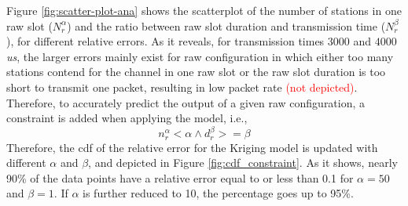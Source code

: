  
 
 
Figure \ref{fig:scatter-plot-ana} shows the scatterplot of the number of stations in one \gls{raw} slot ($N^{\alpha}_{r}$) and the ratio between \gls{raw} slot duration and transmission time ($N^{\beta}_r$), for different relative errors. As it reveals, for transmission times $3000$ and $4000$ \textit{us}, the larger errors mainly exist for \gls{raw} configuration in which either too many stations contend for the channel in one \gls{raw} slot or the \gls{raw} slot duration is too short to transmit one packet, resulting in low packet rate \textcolor{red}{(not depicted)}. Therefore, to accurately predict the output of a given \gls{raw} configuration, a constraint is added when applying the model, i.e., 
\begin{equation} \label{eq:constraint}
n^{\alpha}_r < \alpha \wedge d^{\beta}_r >= \beta
\end{equation}
Therefore, the \gls{cdf} of the relative error for the Kriging model is updated with different $\alpha$ and $\beta$, and depicted in Figure \ref{fig:cdf_constraint}. As it shows, nearly 90\% of the data points have a relative error equal to or less than 0.1 for $\alpha = 50$ and $\beta = 1$. If $\alpha$ is further reduced to 10, the percentage goes up to 95\%. 





